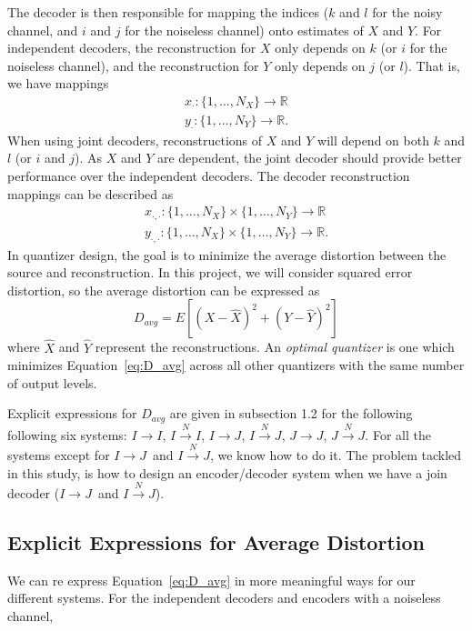 \documentclass[10pt]{article}
\newcommand{\real}{\mathbb{R}}
\newcommand{\sysIIN}{\mbox{$I \overset{N}{\rightarrow} I$}}
\newcommand{\sysII}{\mbox{$I \rightarrow I$}}
\newcommand{\sysIJN}{\mbox{$I \overset{N}{\rightarrow} J$}}
\newcommand{\sysIJ}{\mbox{$I \rightarrow J$}}
\newcommand{\sysJJN}{\mbox{$J \overset{N}{\rightarrow} J$}}
\newcommand{\sysJJ}{\mbox{$J \rightarrow J$}}
\begin{document}
The decoder is then responsible for mapping the indices ($k$ and $l$ for the noisy channel, and $i$ and $j$ for the noiseless channel) onto estimates of $X$ and $Y$. For independent decoders, the reconstruction for $X$ only depends on $k$ (or $i$ for the noiseless channel), and the reconstruction for $Y$ only depends on $j$ (or $l$). That is, we have mappings
\begin{gather*}
    x_{\cdot} : \{1,\ldots,N_X\} \to \real \\
    y_{\cdot} : \{1,\ldots,N_Y\} \to \real.
\end{gather*}
When using joint decoders, reconstructions of $X$ and $Y$ will depend on both $k$ and $l$ (or $i$ and $j$). As $X$ and $Y$ are dependent, the joint decoder should provide better performance over the independent decoders. The decoder reconstruction mappings can be described as 
\begin{gather*}
    x_{\cdot,\cdot} : \{1,\ldots,N_X\} \times \{1,\ldots,N_Y\} \to \real \\
    y_{\cdot,\cdot} : \{1,\ldots,N_X\} \times \{1,\ldots,N_Y\} \to \real.
\end{gather*}
In quantizer design, the goal is to minimize the average distortion between the source and reconstruction. In this project, we will consider squared error distortion, so the average distortion can be expressed as
\begin{equation}
    \label{eq:D_avg}
    D_{avg} = E[{(X-\hat{X})}^2 + {(Y-\hat{Y})}^2]
\end{equation}
where $\hat{X}$ and $\hat{Y}$ represent the reconstructions. An \emph{optimal quantizer} is one which minimizes Equation~\ref{eq:D_avg} across all other quantizers with the same number of output levels.

Explicit expressions for $D_{avg}$ are given in subsection 1.2 for the following following six systems: \sysII, \sysIIN, \sysIJ, \sysIJN, \sysJJ, \sysJJN\@. For all the systems except for \sysIJ\ and \sysIJN, we know how to do it. The problem tackled in this study, is how to design an encoder/decoder system when we have a join decoder (\sysIJ~and \sysIJN).

\subsection{Explicit Expressions for Average Distortion}
We can re express Equation~\ref{eq:D_avg} in more meaningful ways for our different systems. For the independent decoders and encoders with a noiseless channel,
\end{document}

